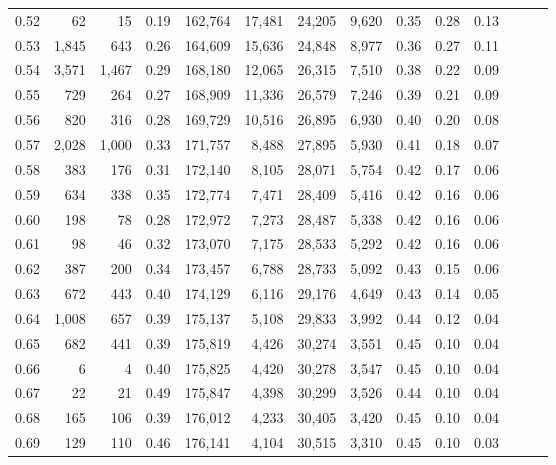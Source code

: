 \begin{tabular}{rrrrrrrrrrrrrr}
0.52 &      62 &     15 &  0.19 &  162,764 &   17,481 &  24,205 &   9,620 &  0.35 &  0.28 &      0.13 \\
0.53 &   1,845 &    643 &  0.26 &  164,609 &   15,636 &  24,848 &   8,977 &  0.36 &  0.27 &      0.11 \\
0.54 &   3,571 &  1,467 &  0.29 &  168,180 &   12,065 &  26,315 &   7,510 &  0.38 &  0.22 &      0.09 \\
0.55 &     729 &    264 &  0.27 &  168,909 &   11,336 &  26,579 &   7,246 &  0.39 &  0.21 &      0.09 \\
0.56 &     820 &    316 &  0.28 &  169,729 &   10,516 &  26,895 &   6,930 &  0.40 &  0.20 &      0.08 \\
0.57 &   2,028 &  1,000 &  0.33 &  171,757 &    8,488 &  27,895 &   5,930 &  0.41 &  0.18 &      0.07 \\
0.58 &     383 &    176 &  0.31 &  172,140 &    8,105 &  28,071 &   5,754 &  0.42 &  0.17 &      0.06 \\
0.59 &     634 &    338 &  0.35 &  172,774 &    7,471 &  28,409 &   5,416 &  0.42 &  0.16 &      0.06 \\
0.60 &     198 &     78 &  0.28 &  172,972 &    7,273 &  28,487 &   5,338 &  0.42 &  0.16 &      0.06 \\
0.61 &      98 &     46 &  0.32 &  173,070 &    7,175 &  28,533 &   5,292 &  0.42 &  0.16 &      0.06 \\
0.62 &     387 &    200 &  0.34 &  173,457 &    6,788 &  28,733 &   5,092 &  0.43 &  0.15 &      0.06 \\
0.63 &     672 &    443 &  0.40 &  174,129 &    6,116 &  29,176 &   4,649 &  0.43 &  0.14 &      0.05 \\
0.64 &   1,008 &    657 &  0.39 &  175,137 &    5,108 &  29,833 &   3,992 &  0.44 &  0.12 &      0.04 \\
0.65 &     682 &    441 &  0.39 &  175,819 &    4,426 &  30,274 &   3,551 &  0.45 &  0.10 &      0.04 \\
0.66 &       6 &      4 &  0.40 &  175,825 &    4,420 &  30,278 &   3,547 &  0.45 &  0.10 &      0.04 \\
0.67 &      22 &     21 &  0.49 &  175,847 &    4,398 &  30,299 &   3,526 &  0.44 &  0.10 &      0.04 \\
0.68 &     165 &    106 &  0.39 &  176,012 &    4,233 &  30,405 &   3,420 &  0.45 &  0.10 &      0.04 \\
0.69 &     129 &    110 &  0.46 &  176,141 &    4,104 &  30,515 &   3,310 &  0.45 &  0.10 &      0.03 \\

\end{tabular}
